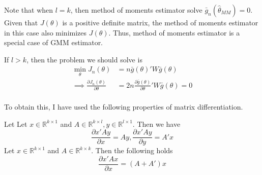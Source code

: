 Note that when $l=k$, then method of moments estimator solve $\bar{g}_n(\hat{\theta}_{MM})=0$. Given that $J(\theta)$ is a positive definite matrix, the method of moments estimator in this case also minimizes $J(\theta)$. Thus, method of moments estimator is a special case of GMM estimator. \par
If $l>k$, then the problem we should solve is
\[
\begin{aligned}
\min_\theta J_n(\theta)&=n\bar{g}(\theta)'W\bar{g}(\theta)\\
\implies\frac{\partial J_n(\theta)}{\partial \theta}& =2n\frac{\partial \bar{g}(\theta)}{\partial\theta}'W\bar{g}(\theta)=0\\
\end{aligned}
\]\par 
To obtain this, I have used the following properties of matrix differentiation.
\begin{mdframed}[backgroundcolor=green!5] 
\begin{property}
Let Let $x\in\mathbb{R}^{k\times 1}$ and $A\in\mathbb{R}^{k\times l}, y\in\mathbb{R}^{l\times 1}$. Then we have
\[
\frac{\partial x'Ay}{\partial x}=Ay, \frac{\partial x'Ay}{\partial y}=A'x
\]Let $x\in\mathbb{R}^{k\times 1}$ and $A\in\mathbb{R}^{k\times k}$. Then the following holds
\[
\frac{\partial x'Ax}{\partial x}=(A+A')x
\]
\end{property}
\end{mdframed}


